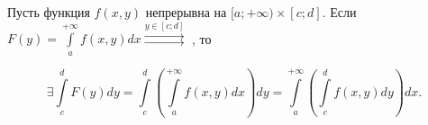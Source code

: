 \documentclass[../../main.tex]{subfiles}
\begin{document}
\begin{thm}
Пусть функция $f(x,y)$ непрерывна на $[a;+\infty)\times [c;d]$. Если $F(y) = 
\int\limits_a^{+\infty}f(x,y)dx \overset{y \in [c;d]}{\rightrightarrows}$ , то 

\begin{equation} \label{lec10:14}
	\exists \int\limits_c^d F(y)dy =\int\limits_c^d\left( 
	\int\limits_a^{+\infty}f(x,y)dx\right) dy = 
	\int\limits_a^{+\infty}\left(\int\limits_c^d f(x,y)dy\right)dx.
\end{equation}

\end{thm}
\end{document}
